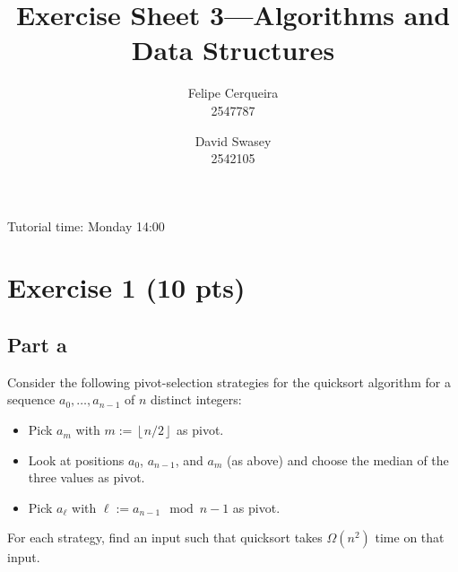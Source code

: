 \documentclass[a4paper]{article}
\title{Exercise Sheet 3---Algorithms and Data Structures}
\author{Felipe Cerqueira \\ 2547787 \and David Swasey \\ 2542105}
\newcommand*{\floor}[1]{\left\lfloor{#1}\right\rfloor}
\begin{document}
\maketitle

Tutorial time: Monday 14:00

\section{Exercise 1 (10 pts)}

\subsection{Part a}
Consider the following pivot-selection strategies for the quicksort algorithm for a sequence $a_0, \ldots, a_{n-1}$ of $n$ distinct integers:
\begin{itemize}
	\item Pick $a_m$ with $m := \floor{n/2}$ as pivot.
	\item Look at positions $a_0$, $a_{n-1}$, and $a_m$ (as above) and choose the median of the three values as pivot.
	\item Pick $a_\ell$ with $\ell := a_{n-1} \mod n-1$ as pivot.
\end{itemize}
For each strategy, find an input such that quicksort takes $\Omega(n^2)$ time on that input.
\end{document}

